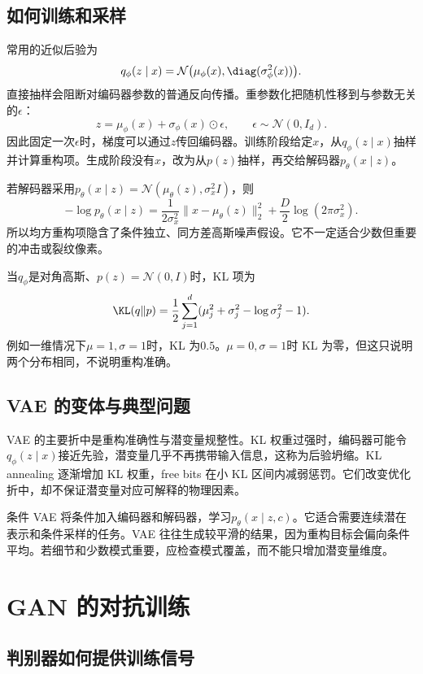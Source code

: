 \subsection{如何训练和采样}

常用的近似后验为
\[
q_{\phi}(z\mid x)=\mathcal N\bigl(\mu_{\phi}(x),\diag(\sigma_{\phi}^2(x))\bigr).
\]
直接抽样会阻断对编码器参数的普通反向传播。重参数化把随机性移到与参数无关的$\epsilon$：
\begin{equation}
z=\mu_{\phi}(x)+\sigma_{\phi}(x)\odot\epsilon,
\qquad \epsilon\sim\mathcal N(0,I_d).
\end{equation}
因此固定一次$\epsilon$时，梯度可以通过$z$传回编码器。训练阶段给定$x$，从$q_{\phi}(z\mid x)$抽样并计算重构项。生成阶段没有$x$，改为从$p(z)$抽样，再交给解码器$p_{\theta}(x\mid z)$。

若解码器采用$p_{\theta}(x\mid z)=\mathcal N(\mu_{\theta}(z),\sigma_x^2I)$，则
\[
-\log p_{\theta}(x\mid z)=\frac{1}{2\sigma_x^2}\|x-\mu_{\theta}(z)\|_2^2+\frac D2\log(2\pi\sigma_x^2).
\]
所以均方重构项隐含了条件独立、同方差高斯噪声假设。它不一定适合少数但重要的冲击或裂纹像素。

当$q_{\phi}$是对角高斯、$p(z)=\mathcal N(0,I)$时，KL 项为
\[
\KL(q\|p)=\frac12\sum_{j=1}^{d}(\mu_j^2+\sigma_j^2-\log\sigma_j^2-1).
\]
例如一维情况下$\mu=1,\sigma=1$时，KL 为$0.5$。$\mu=0,\sigma=1$时 KL 为零，但这只说明两个分布相同，不说明重构准确。

\subsection{VAE 的变体与典型问题}

VAE 的主要折中是重构准确性与潜变量规整性。KL 权重过强时，编码器可能令$q_{\phi}(z\mid x)$接近先验，潜变量几乎不再携带输入信息，这称为后验坍缩。KL annealing 逐渐增加 KL 权重，free bits 在小 KL 区间内减弱惩罚。它们改变优化折中，却不保证潜变量对应可解释的物理因素。

条件 VAE 将条件加入编码器和解码器，学习$p_{\theta}(x\mid z,c)$。它适合需要连续潜在表示和条件采样的任务。VAE 往往生成较平滑的结果，因为重构目标会偏向条件平均。若细节和少数模式重要，应检查模式覆盖，而不能只增加潜变量维度。

\section{GAN 的对抗训练}

\subsection{判别器如何提供训练信号}

